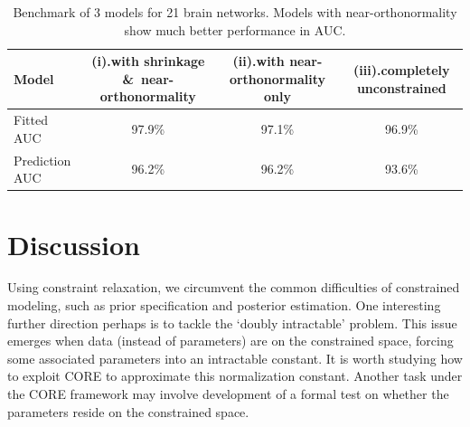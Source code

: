 \documentclass[10pt,fleqn]{article}
\DeclareMathOperator{\1}{\mathbbm{1}} \DeclareMathOperator{\bigO}{\mc O}
\begin{document}
\begin{table}[h] \begin{center} \tiny
\begin{tabular}{ l| c | c| c } \hline     Model  & (i).with
shrinkage \&\ near-orthonormality & (ii).with  near-orthonormality
only                              & (iii).completely unconstrained                   \\         \hline
Fitted AUC                        & 97.9\%                         & 97.1\% & 96.9\% \\ \hline
  Prediction AUC                    & 96.2\%                         & 96.2\% & 93.6\%
  \\
  \hline
\end{tabular}
\end{center} \caption{Benchmark of 3 models for 21 brain networks. Models with near-orthonormality show much better performance in AUC.
\label{network_model}} \end{table}

\section{Discussion}

Using  constraint relaxation, we circumvent the common difficulties of constrained modeling, such as prior specification and posterior estimation.
One interesting further direction perhaps is to tackle the  `doubly
intractable' problem. This issue emerges when data (instead of parameters) are on the constrained space, forcing some associated parameters into an intractable constant. It is worth studying how to exploit CORE to approximate this normalization constant. Another task under the CORE framework may involve development of a formal test on whether the parameters reside on the constrained space.


 


\appendix
\end{document}
